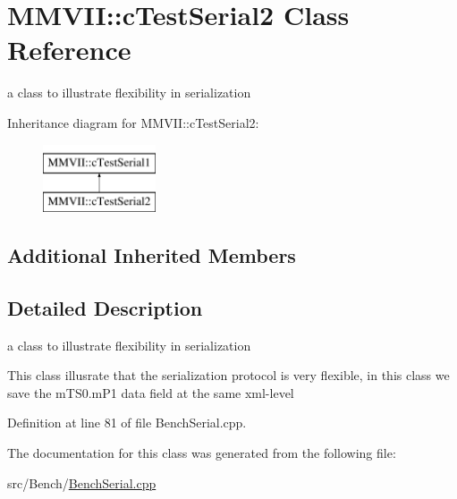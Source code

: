 \hypertarget{classMMVII_1_1cTestSerial2}{}\section{M\+M\+V\+II\+:\+:c\+Test\+Serial2 Class Reference}
\label{classMMVII_1_1cTestSerial2}


a class to illustrate flexibility in serialization  


Inheritance diagram for M\+M\+V\+II\+:\+:c\+Test\+Serial2\+:\begin{figure}[H]
\begin{center}
\leavevmode
\includegraphics[height=2.000000cm]{classMMVII_1_1cTestSerial2}
\end{center}
\end{figure}
\subsection*{Additional Inherited Members}


\subsection{Detailed Description}
a class to illustrate flexibility in serialization 

This class illusrate that the serialization protocol is very flexible, in this class we save the m\+T\+S0.\+m\+P1 data field at the same xml-\/level 

Definition at line 81 of file Bench\+Serial.\+cpp.



The documentation for this class was generated from the following file\+:\begin{DoxyCompactItemize}
\item 
src/\+Bench/\hyperlink{BenchSerial_8cpp}{Bench\+Serial.\+cpp}\end{DoxyCompactItemize}
